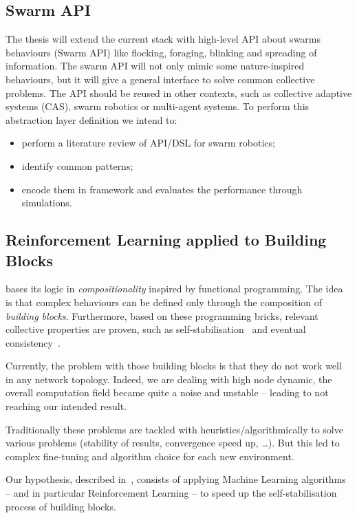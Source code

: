 \documentclass[11pt]{article}
\begin{document}
\subsection{Swarm API}\label{swarm-api}
The thesis will extend the current \ac{} stack with high-level API about swarms behaviours (Swarm API) like flocking, foraging, blinking and spreading of information. The swarm API will not only mimic some nature-inspired behaviours, but it will give a general interface to solve common collective problems. The API should be reused in other contexts, such as collective adaptive systems (CAS), swarm robotics or multi-agent systems.
To perform this abstraction layer definition we intend to:
\begin{itemize}
	\item perform a literature review of API/DSL for swarm robotics;
	\item identify common patterns;
	\item encode them in \ac{} framework and evaluates the performance through simulations.
\end{itemize}
\subsection{Reinforcement Learning applied to Building Blocks}\label{rl-future}
\ac{} bases its logic in \textit{compositionality} inspired by functional programming. The idea is that complex behaviours can be defined only through the composition of \emph{building blocks}. Furthermore, based on these programming bricks, relevant collective properties are proven, such as self-stabilisation~\cite{DBLP:journals/corr/abs-1711-08297} and eventual consistency~\cite{DBLP:conf/saso/BealVPD16}. 

Currently, the problem with those building blocks is that they do not work well in any network topology. Indeed, we are dealing with high node dynamic, the overall computation field became quite a noise and unstable -- leading to not reaching our intended result.

Traditionally these problems are tackled with heuristics/algorithmically to solve various problems (stability of results, convergence speed up, \dots{}). But this led to complex fine-tuning and algorithm choice for each new environment.

Our hypothesis, described in~\cite{research}, consists of applying Machine Learning algorithms -- and in particular Reinforcement Learning --
to speed up the self-stabilisation process of building blocks.
\end{document}
